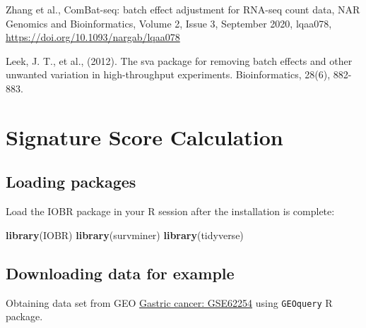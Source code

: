 \documentclass[
  12pt,
]{book}
\newenvironment{Shaded}{\begin{snugshade}}{\end{snugshade}}
\newcommand{\FunctionTok}[1]{\textcolor[rgb]{0.13,0.29,0.53}{\textbf{#1}}}
\newcommand{\NormalTok}[1]{#1}
\begin{document}
Zhang et al., ComBat-seq: batch effect adjustment for RNA-seq count data, NAR Genomics and Bioinformatics, Volume 2, Issue 3, September 2020, lqaa078, \url{https://doi.org/10.1093/nargab/lqaa078}

Leek, J. T., et al., (2012). The sva package for removing batch effects and other unwanted variation in high-throughput experiments. Bioinformatics, 28(6), 882-883.

\hypertarget{signature-score-calculation}{%
\chapter{\texorpdfstring{\textbf{Signature Score Calculation}}{Signature Score Calculation}}\label{signature-score-calculation}}

\hypertarget{loading-packages-1}{%
\section{Loading packages}\label{loading-packages-1}}

Load the IOBR package in your R session after the installation is complete:

\begin{Shaded}
\begin{Highlighting}[]
\FunctionTok{library}\NormalTok{(IOBR)}
\FunctionTok{library}\NormalTok{(survminer)}
\FunctionTok{library}\NormalTok{(tidyverse)}
\end{Highlighting}
\end{Shaded}

\hypertarget{downloading-data-for-example}{%
\section{Downloading data for example}\label{downloading-data-for-example}}

Obtaining data set from GEO \href{https://pubmed.ncbi.nlm.nih.gov/25894828/}{Gastric cancer: GSE62254} using \texttt{GEOquery} R package.
\end{document}
